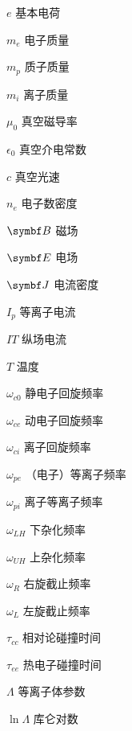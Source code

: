 \begin{notation}

  \begin{notationlist}{2em}
    \item[$\displaystyle e$] 基本电荷
    \item[$\displaystyle m_e$] 电子质量
    \item[$\displaystyle m_p$] 质子质量
    \item[$\displaystyle m_i$] 离子质量
    \item[$\displaystyle \mu_0$] 真空磁导率
    \item[$\displaystyle \epsilon_0$] 真空介电常数
    \item[$\displaystyle c$] 真空光速
    \item[$\displaystyle n_e$] 电子数密度
    \item[$\displaystyle \vB$] 磁场
    \item[$\displaystyle \vE$] 电场
    \item[$\displaystyle \vJ$] 电流密度
    \item[$\displaystyle I_p$] 等离子电流
    \item[$\displaystyle IT$]   纵场电流

    \item[$\displaystyle T$] 温度  
    \item[$\displaystyle \omega_{c0}$] 静电子回旋频率    
    \item[$\displaystyle \omega_{ce}$] 动电子回旋频率
    \item[$\displaystyle \omega_{ci}$] 离子回旋频率
    \item[$\displaystyle \omega_{pe}$] （电子）等离子频率
    \item[$\displaystyle \omega_{pi}$] 离子等离子频率
    \item[$\displaystyle \omega_{LH}$] 下杂化频率
    \item[$\displaystyle \omega_{UH}$] 上杂化频率
    \item[$\displaystyle \omega_{R}$] 右旋截止频率
    \item[$\displaystyle \omega_L$] 左旋截止频率
    \item[$\displaystyle \tau_{cc}$] 相对论碰撞时间
    \item[$\displaystyle \tau_{ee}$] 热电子碰撞时间
    \item[$\displaystyle \Lambda$] 等离子体参数
    \item[$\displaystyle \ln\Lambda$] 库仑对数
  \end{notationlist}
\end{notation}




